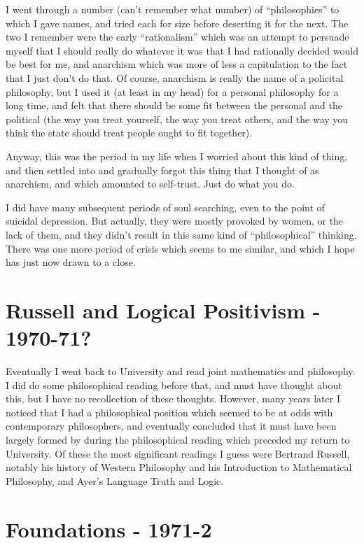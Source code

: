 \documentclass[10pt,titlepage]{book}
\begin{document}
I went through a number (can't remember what number) of ``philosophies'' to which I gave names, and tried each for size before deserting it for the next.
The two I remember were the early ``rationalism'' which was an attempt to persuade myself that I should really do whatever it was that I had rationally decided would be best for me, and anarchism which was more of less a capitulation to the fact that I just don't do that.
Of course, anarchism is really the name of a policital philosophy, but I used it (at least in my head) for a personal philosophy for a long time, and felt that there should be some fit between the personal and the political (the way you treat yourself, the way you treat others, and the way you think the state should treat people ought to fit together).

Anyway, this was the period in my life when I worried about this kind of thing, and then settled into and gradually forgot this thing that I thought of as anarchism, and which amounted to self-trust.
Just do what you do.

I did have many subsequent periods of soul searching, even to the point of suicidal depression.
But actually, they were mostly provoked by women, or the lack of them, and they didn't result in this same kind of ``philosophical'' thinking.
There was one more period of crisis which seems to me similar, and which I hope has just now drawn to a close.

\section{Russell and Logical Positivism - 1970-71?}

Eventually I went back to University and read joint mathematics and philosophy.
I did do some philosophical reading before that, and must have thought about this, but I have no recollection of these thoughts.
However, many years later I noticed that I had a philosophical position which seemed to be at odds with contemporary philosophers, and eventually concluded that it must have been largely formed by during the philosophical reading which preceded my return to University.
Of these the most significant readings I guess were Bertrand Russell, notably his history of Western Philosophy and his Introduction to Mathematical Philosophy, and Ayer's Language Truth and Logic.

\section{Foundations - 1971-2}
\end{document}
